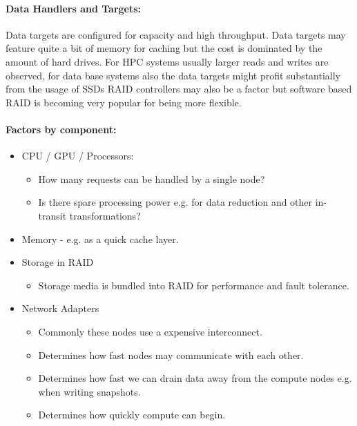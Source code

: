 \documentclass{../../template/esiwace-report}
\begin{document}
\paragraph{Data Handlers and Targets:}
Data targets are configured for capacity and high throughput.
Data targets may feature quite a bit of memory for caching but the cost is dominated by the amount of hard drives.
For HPC systems usually larger reads and writes are observed, for data base systems also the data targets might profit substantially from the usage of SSDs
RAID controllers may also be a factor but software based RAID is becoming very popular for being more flexible.

\paragraph{Factors by component:}
\begin{itemize}
	\item  CPU / GPU / Processors:
	\begin{itemize}
		\item How many requests can be handled by a single node?
		\item Is there spare processing power e.g. for data reduction and other in-transit transformations?
	\end{itemize}

	\item Memory -  e.g. as a quick cache layer.

	\item Storage in RAID
	\begin{itemize}
		\item Storage media is bundled into RAID for performance and fault tolerance.
	\end{itemize}

	\item Network Adapters
	\begin{itemize}
		\item Commonly these nodes use a expensive interconnect.
		\item Determines how fast nodes may communicate with each other.
		\item Determines how fast we can drain data away from the compute nodes e.g. when writing snapshots.
		\item Determines how quickly compute can begin.
	\end{itemize}

\end{itemize}
\end{document}
